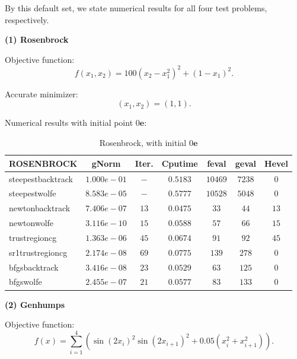 \documentclass[11pt]{report}
\begin{document}
By this default set, we state numerical results for all four test problems, respectively.

\textbf{(1) Rosenbrock }

Objective function: 
\begin{equation}
    f(x_1,x_2) = 100(x_2-x_1^2)^2+(1-x_1)^2.
\end{equation}

Accurate minimizer:
\begin{equation}
    (x_1,x_2) = (1,1).
\end{equation}

Numerical results with initial point $0\mathbf{e}$:
\begin{table}[H]
    \caption{Rosenbrock, with initial $0\mathbf{e}$}
    \label{tab:Rosenbrock_initial}
    \begin{center}
        \begin{tabular}{l|cccccc}
\textbf{ROSENBROCK}&    gNorm       &   Iter.  &   Cputime   &   feval&geval&Hevel\\
\hline
steepestbacktrack   &   $1.000e-01 $&   $- $&   $0.5183  $&$10469$&$7238 $&$0    $       \\
steepestwolfe       &   $8.583e-05 $&   $-$&   $0.5777  $&$10528$&$5048 $&$0    $       \\
newtonbacktrack     &   $7.406e-07 $&   $13   $&   $0.0475  $&$33   $&$44   $&$13   $       \\
newtonwolfe         &   $3.116e-10 $&   $15   $&   $0.0588  $&$57   $&$66   $&$15   $       \\
trustregioncg       &   $1.363e-06 $&   $45   $&   $0.0674  $&$91   $&$92   $&$45   $       \\
sr1trustregioncg    &   $2.174e-08 $&   $69   $&   $0.0775  $&$139  $&$278  $&$0    $       \\
bfgsbacktrack       &   $3.416e-08 $&   $23   $&   $0.0529  $&$63   $&$125  $&$0    $       \\
bfgswolfe           &   $2.455e-07 $&   $21   $&   $0.0577  $&$83   $&$133  $&$0    $       \\
     \end{tabular}
    \end{center}
\end{table}

\textbf{(2) Genhumps }

Objective function: 
\begin{equation}
    f(x) = \sum_{i=1}^4(\sin(2x_i)^2\sin(2x_{i+1})^2+0.05(x_i^2+x_{i+1}^2)).
\end{equation}
\end{document}
